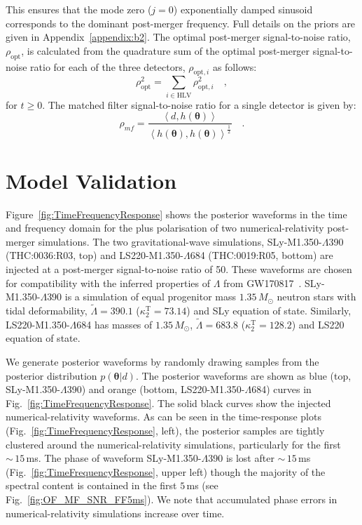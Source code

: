 \documentclass[../Thesis.tex]{subfiles}
\begin{document}
    This ensures that the mode zero ($j=0$) exponentially damped sinusoid corresponds to the dominant post-merger frequency. 
    Full details on the priors are given in Appendix~\ref{appendix:b2}. 
    The optimal post-merger signal-to-noise ratio, $\rho_{\mathrm{opt}}$, is calculated from the quadrature sum of the optimal post-merger signal-to-noise ratio for each of the three detectors, $\rho_{\mathrm{opt},i}$ as follows:
\begin{equation}
    \rho_{\mathrm{opt}}^2 = \sum_{i \in  \mathrm{HLV}} \rho_{\mathrm{opt},i}^2\quad,\label{eq:OptimalSNR2}
\end{equation}
    for $t \geq 0$.
    The matched filter signal-to-noise ratio for a single detector is given by:
\begin{equation}
    \rho_{mf} = \frac{\left<d, h(\boldsymbol{\theta})\right>}{\left< h(\boldsymbol{\theta}),h(\boldsymbol{\theta})\right>^\frac{1}{2}}\quad.\label{eq:MatchedFilterSNR2}
\end{equation} \par

\section{Model Validation}\label{sec:modelfit2}
     Figure~\ref{fig:TimeFrequencyResponse} shows the posterior waveforms in the time and frequency domain for the plus polarisation of two numerical-relativity post-merger simulations. The two gravitational-wave simulations, SLy-M1.350-$\Lambda$390 (THC:0036:R03, top) and LS220-M1.350-$\Lambda$684 (THC:0019:R05, bottom) are injected at a post-merger signal-to-noise ratio of 50. 
     These waveforms are chosen for compatibility with the inferred properties of $\Lambda$ from GW170817~\cite{GW170817Detection,Annala2018,Radice2018,Most2018,De2018,GW170817Properties}. 
     SLy-M1.350-$\Lambda$390 is a simulation of equal progenitor mass $1.35\,M_\odot$ neutron stars with tidal deformability, $\tilde{\Lambda}=390.1$ ($\kappa_2^{\mathrm{T}}=73.14$) and SLy equation of state. Similarly, LS220-M1.350-$\Lambda$684 has masses of $1.35\,M_\odot$, $\tilde{\Lambda}=683.8$ ($\kappa_2^{\mathrm{T}}=128.2$) and LS220 equation of state. \par
     We generate posterior waveforms by randomly drawing samples from the posterior distribution $p(\boldsymbol{\theta}|d)$. The posterior waveforms are shown as  blue (top, SLy-M1.350-$\Lambda$390) and orange (bottom, LS220-M1.350-$\Lambda$684)  curves in Fig.~\ref{fig:TimeFrequencyResponse}. 
     The solid black curves show the injected numerical-relativity waveforms. 
     As can be seen in the time-response plots (Fig.~\ref{fig:TimeFrequencyResponse}, left), the posterior samples are tightly clustered around the numerical-relativity simulations, particularly for the first $\sim\,15\,$ms. 
     The phase of waveform SLy-M1.350-$\Lambda$390 is lost after $\sim\,15\,$ms (Fig.~\ref{fig:TimeFrequencyResponse}, upper left) though the majority of the spectral content is contained in the first $5\,$ms (see Fig.~\ref{fig:OF_MF_SNR_FF5ms}).
     We note that accumulated phase errors in numerical-relativity simulations increase over time.\par
 
\end{document}
